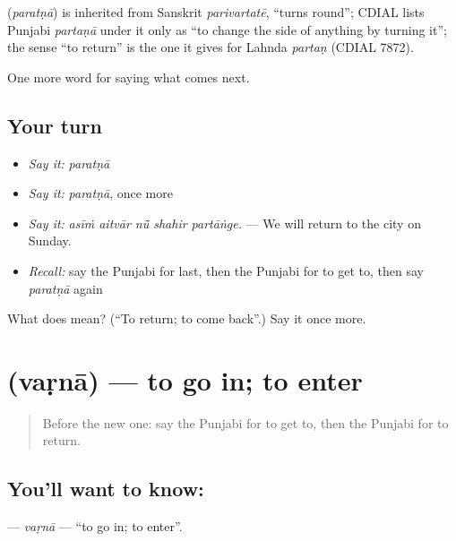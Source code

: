 \begin{cousinweb}
\textbf{} (\emph{paratṇā}) is inherited from Sanskrit \emph{parivartatē}, \textquotedblleft{}turns round\textquotedblright{}; CDIAL lists Punjabi \emph{partaṇā} under it only as \textquotedblleft{}to change the side of anything by turning it\textquotedblright{}; the sense \textquotedblleft{}to return\textquotedblright{} is the one it gives for Lahnda \emph{partaṇ} (CDIAL 7872).
\end{cousinweb}

\begin{grammarlens}[title={What you've built}]
One more word for saying what comes next.
\end{grammarlens}

\subsection*{Your turn}
\begin{itemize}
\raggedright
  \item \emph{Say it:} \emph{paratṇā}
  \item \emph{Say it:} \emph{paratṇā}, once more
  \item \emph{Say it:} \emph{asīṁ aitvār nū̃ shahir partāṅge.} — We will return to the city on Sunday.
  \item \emph{Recall:} say the Punjabi for last, then the Punjabi for to get to, then say \emph{paratṇā} again
\end{itemize}

\begin{tcolorbox}[breakable,colback=teal!4,colframe=teal!35!black,title={Before you move on}]
What does  mean? (\textquotedblleft{}To return; to come back\textquotedblright{}.) Say it once more.
\end{tcolorbox}
\section[\texorpdfstring{\pa{ਵੜਨਾ} (vaṛnā)}{ਵੜਨਾ (vaṛnā)}]{ (vaṛnā) — to go in; to enter}

\label{lesson:PA-C285-varna}



\begin{quote}
Before the new one: say the Punjabi for to get to, then the Punjabi for to return.
\end{quote}

\subsection*{You'll want to know: }
\textbf{} — \emph{vaṛnā} — \textquotedblleft{}to go in; to enter\textquotedblright{}.

